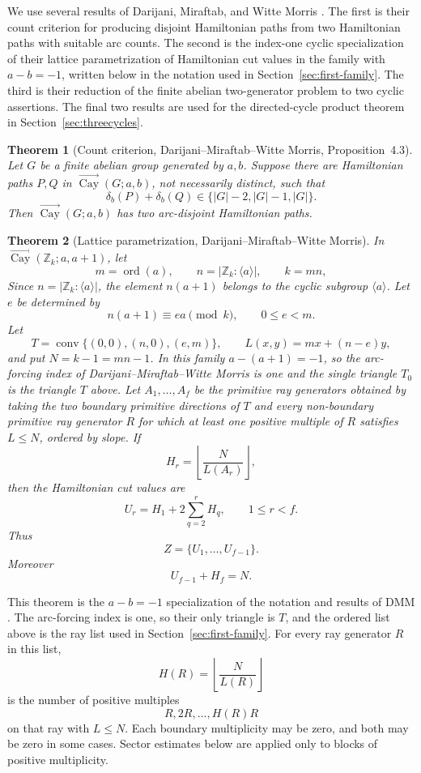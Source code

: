 \documentclass[11pt]{article}
\newtheorem{theorem}{Theorem}[section]
\newcommand{\Cay}{\overrightarrow{\operatorname{Cay}}}
\newcommand{\Z}{\mathbb Z}
\newcommand{\ord}{\operatorname{ord}}
\begin{document}
We use several results of Darijani, Miraftab, and Witte Morris \cite{DMM}.  The first is their count criterion for producing disjoint Hamiltonian paths from two Hamiltonian paths with suitable arc counts.  The second is the index-one cyclic specialization of their lattice parametrization of Hamiltonian cut values in the family with \(a-b=-1\), written below in the notation used in Section~\ref{sec:first-family}.  The third is their reduction of the finite abelian two-generator problem to two cyclic assertions.  The final two results are used for the directed-cycle product theorem in Section~\ref{sec:threecycles}.

\begin{theorem}[Count criterion, Darijani--Miraftab--Witte Morris, Proposition~4.3]\label{input:count}
Let $G$ be a finite abelian group generated by $a,b$.  Suppose there are Hamiltonian paths $P,Q$ in $\Cay(G;a,b)$, not necessarily distinct, such that
\[
        \delta_b(P)+\delta_b(Q)
        \in
        \{|G|-2,|G|-1,|G|\}.
\]
Then $\Cay(G;a,b)$ has two arc-disjoint Hamiltonian paths.
\end{theorem}


\begin{theorem}[Lattice parametrization, Darijani--Miraftab--Witte Morris]\label{input:lattice}
In $\Cay(\Z_k;a,a+1)$, let
\[
        m=\ord(a),
        \qquad
        n=|\Z_k:\langle a\rangle|,
        \qquad
        k=mn,
\]
Since $n=|\Z_k:\langle a\rangle|$, the element $n(a+1)$ belongs to the cyclic subgroup $\langle a\rangle$.  Let $e$ be determined by
\[
        n(a+1)\equiv ea \pmod{k},
        \qquad 0\le e<m.
\]
Let
\[
        T=\operatorname{conv}\{(0,0),(n,0),(e,m)\},
        \qquad
        L(x,y)=mx+(n-e)y,
\]
and put $N=k-1=mn-1$.  In this family $a-(a+1)=-1$, so the arc-forcing index of Darijani--Miraftab--Witte Morris is one and the single triangle $T_0$ is the triangle $T$ above.  Let $A_1,\ldots,A_f$ be the primitive ray generators obtained by taking the two boundary primitive directions of $T$ and every non-boundary primitive ray generator $R$ for which at least one positive multiple of $R$ satisfies $L\le N$, ordered by slope.  If
\[
        H_r=\left\lfloor\frac{N}{L(A_r)}\right\rfloor,
\]
then the Hamiltonian cut values are
\[
        U_r=H_1+2\sum_{q=2}^{r}H_q,
        \qquad 1\le r<f.
\]
Thus
\[
        Z=\{U_1,\ldots,U_{f-1}\}.
\]
Moreover
\[
        U_{f-1}+H_f=N.
\]
\end{theorem}

This theorem is the $a-b=-1$ specialization of the notation and results of DMM \cite[Notation~3.19, Theorem~3.21, Lemma~3.23]{DMM}.  The arc-forcing index is one, so their only triangle is $T$, and the ordered list above is the ray list used in Section~\ref{sec:first-family}.  For every ray generator $R$ in this list,
\[
        H(R)=\left\lfloor \frac{N}{L(R)}\right\rfloor
\]
is the number of positive multiples
\[
        R,2R,\ldots,H(R)R
\]
on that ray with $L\le N$.  Each boundary multiplicity may be zero, and both may be zero in some cases.  Sector estimates below are applied only to blocks of positive multiplicity.
\end{document}
